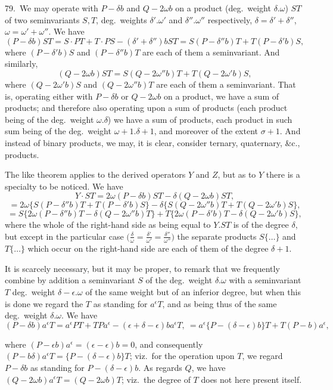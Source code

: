 \documentclass[11pt]{article}
\begin{document}
79.\ We may operate with $P - \delta b$ and $Q - 2\omega b$ on a product (deg.\ weight $\delta . \omega$) $ST$ of two seminvariants $S, T$, deg.\ weights $\delta' . \omega'$ and $\delta'' . \omega''$ respectively, $\delta = \delta' + \delta''$, $\omega = \omega' + \omega''$. We have
\[
(P - \delta b)ST = S \cdot PT + T \cdot PS - (\delta' + \delta'')bST = S(P - \delta''b)T + T(P - \delta'b)S,
\]
where $(P - \delta'b)S$ and $(P - \delta''b)T$ are each of them a seminvariant. And similarly,
\[
(Q - 2\omega b)ST = S(Q - 2\omega''b)T + T(Q - 2\omega'b)S,
\]
where $(Q - 2\omega'b)S$ and $(Q - 2\omega''b)T$ are each of them a seminvariant. That is, operating either with $P - \delta b$ or $Q - 2\omega b$ on a product, we have a sum of products; and therefore also operating upon a sum of products (each product being of the deg.\ weight $\omega . \delta$) we have a sum of products, each product in such sum being of the deg.\ weight $\omega + 1 . \delta + 1$, and moreover of the extent $\sigma + 1$. And instead of binary products, we may, it is clear, consider ternary, quaternary, \&c., products.

The like theorem applies to the derived operators $Y$ and $Z$, but as to $Y$ there is a specialty to be noticed. We have
\[
Y \cdot ST = 2\omega (P - \delta b)ST - \delta (Q - 2\omega b)ST,
\]
\[
= 2\omega \{S(P - \delta''b)T + T(P - \delta'b)S\} - \delta \{S(Q - 2\omega''b)T + T(Q - 2\omega'b)S\},
\]
\[
= S\{2\omega (P - \delta''b)T - \delta (Q - 2\omega''b)T\} + T\{2\omega (P - \delta'b)T - \delta (Q - 2\omega'b)S\},
\]
where the whole of the right-hand side as being equal to $Y . ST$ is of the degree $\delta$, but except in the particular case $\bigl(\frac{\delta}{\omega} = \frac{\delta'}{\omega'} = \frac{\delta''}{\omega''}\bigr)$ the separate products $S\{\ldots\}$ and $T\{\ldots\}$ which occur on the right-hand side are each of them of the degree $\delta + 1$.

It is scarcely necessary, but it may be proper, to remark that we frequently combine by addition a seminvariant $S$ of the deg.\ weight $\delta . \omega$ with a seminvariant $T$ deg.\ weight $\delta - \epsilon . \omega$ of the same weight but of an inferior degree, but when this is done we regard the $T$ as standing for $a^\epsilon T$, and as being thus of the same deg.\ weight $\delta . \omega$. We have
\[
(P - \delta b) a^\epsilon T = a^\epsilon PT + TPa^\epsilon - (\epsilon + \delta - \epsilon) b a^\epsilon T,\ = a^\epsilon \{P - (\delta - \epsilon) b\} T + T(P - b)a^\epsilon,
\]

\clearpage
where $(P - \epsilon b) a^\epsilon = (\epsilon - \epsilon) b = 0$, and consequently $(P - b\delta) a^\epsilon T = \{P - (\delta - \epsilon) b\} T$; viz.\ for the operation upon $T$, we regard $P - \delta b$ as standing for $P - (\delta - \epsilon) b$. As regards $Q$, we have $(Q - 2\omega b) a^\epsilon T = (Q - 2\omega b)T$; viz.\ the degree of $T$ does not here present itself.
\end{document}
